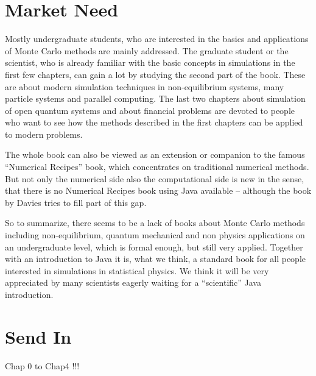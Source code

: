 \documentclass[a4paper]{book}
\begin{document}



\section*{Market Need}
Mostly undergraduate students, who are interested in the basics and
applications of Monte Carlo methods are mainly addressed.
The graduate student or the scientist, who is already familiar with 
the basic concepts in simulations in the first few chapters, 
can gain a lot by studying the second part of the book.
These are about modern simulation techniques in non-equilibrium systems, 
many particle systems and parallel computing.
The last two chapters about simulation of open quantum systems and about 
financial problems are devoted to people who want to see how the methods 
described in the first chapters can be applied to modern problems.

The whole book can also be viewed as an extension or companion to the famous ``Numerical Recipes'' book, which concentrates on traditional numerical methods.
But not only the numerical side also the computational side is new in the 
sense, that there is no Numerical Recipes book using Java available -- 
although the book by Davies tries to fill part of this gap.

So to summarize, there seems to be a lack of books about Monte Carlo
methods including non-equilibrium, quantum mechanical and non
physics applications on an undergraduate level, which is formal enough,
but still very applied. Together with an introduction to Java it is, what
we think, a standard book for all people interested in simulations
in statistical physics. We think it will be very appreciated by many
scientists eagerly waiting for a ``scientific'' Java introduction.


\section*{Send In}
Chap 0 to Chap4 !!!
\end{document}
